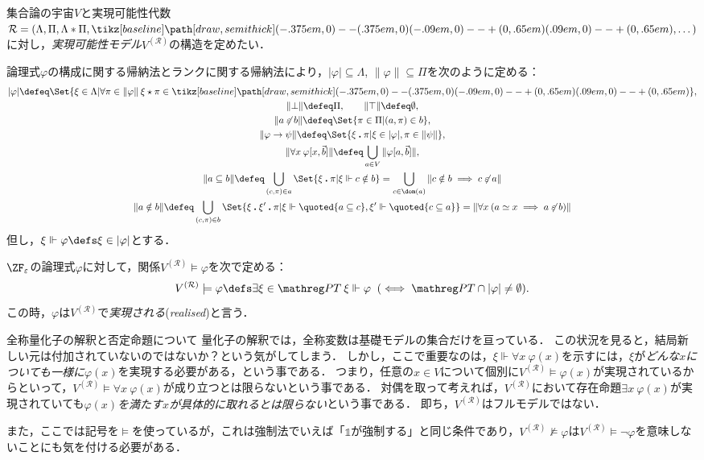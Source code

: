 \documentclass[realisability.tex]{subfiles}
\begin{document}
\begin{definition}[実現可能性モデル]
 集合論の宇宙$V$と実現可能性代数$\mathcal{R} = (\Lambda, \Pi, \Lambda \ast \Pi, \pole, \dots)$に対し，\emph{実現可能性モデル}$V^{(\mathcal{R})}$の構造を定めたい．

 論理式$\varphi$の構成に関する帰納法とランクに関する帰納法により，$|\varphi| \subseteq \Lambda$, $\|\varphi\| \subseteq \Pi$を次のように定める：
 \begin{gather*}
  |\varphi| \defeq \Set{ \xi \in \Lambda | \forall \pi \in \|\varphi\| \: \xi \cons \pi \in \pole},\\
  \|\bot\| \defeq \Pi,\qquad \|\top\| \defeq \emptyset, \\
  \|a \strnin b\| \defeq \Set{ \pi \in \Pi | (a, \pi) \in b},\\
  \|\varphi \to \psi\| \defeq \Set{ \xi \push \pi | {\xi \in |\varphi|, \pi \in \|\psi\|}},\\
  \|\forall x \: \varphi[x, \vec{b}]\| \defeq \bigcup_{a \in V} \| \varphi[a, \vec{b}]\|,\\
  \| a \subseteq b \| \defeq \bigcup_{(c, \pi) \in a} \Set{ \xi \push \pi | \xi \Vdash c \notin b}
  = \bigcup_{c \in \dom(a)} \|c \notin b \implies c \strnin a\|\\
  \| a \notin b \| \defeq \bigcup_{(c, \pi) \in b} \Set{ \xi \push \xi' \push \pi | \xi \Vdash \quoted{a \subseteq c}, \xi' \Vdash \quoted{c \subseteq a}}
   = \|\forall x \: (a \simeq x \implies a \strnin b)\|
 \end{gather*}
 但し，$\xi \Vdash \varphi \defs \xi \in |\varphi|$とする．

 $\ZF_{\varepsilon}$の論理式$\varphi$に対して，関係$V^{(\mathcal{R})} \models \varphi$を次で定める：
 \[
  V^{(\mathcal{R})} \models \varphi \defs \exists \xi \in \PT\: \xi \Vdash \varphi \mathrel{}(\iff \PT \cap |\varphi| \neq \emptyset).
 \]
 この時，$\varphi$は$V^{(\mathcal{R})}$で\emph{実現される}(\emph{realised})と言う．
\end{definition}

\begin{remark}{全称量化子の解釈と否定命題について}
 量化子の解釈では，全称変数は基礎モデルの集合だけを亘っている．
 この状況を見ると，結局新しい元は付加されていないのではないか？という気がしてしまう．
 しかし，ここで重要なのは，$\xi \Vdash \forall x \: \varphi(x)$を示すには，$\xi$が\emph{どんな$x$についても一様に}$\varphi(x)$を実現する必要がある，という事である．
 つまり，任意の$x \in V$について個別に$V^{(\mathcal{R})} \models \varphi(x)$が実現されているからといって，$V^{(\mathcal{R})} \models \forall x\: \varphi(x)$が成り立つとは限らないという事である．
 対偶を取って考えれば，$V^{(\mathcal{R})}$において存在命題$\exists x \: \varphi(x)$が実現されていても\emph{$\varphi(x)$を満たす$x$が具体的に取れるとは限らない}という事である．
 即ち，$V^{(\mathcal{R})}$はフルモデルではない．

 また，ここでは記号を$\models$を使っているが，これは強制法でいえば「$\mathds{1}$が強制する」と同じ条件であり，$V^{(\mathcal{R})} \not\models \varphi$は$V^{(\mathcal{R})} \models \neg \varphi$を意味しないことにも気を付ける必要がある．
\end{remark}
\end{document}
